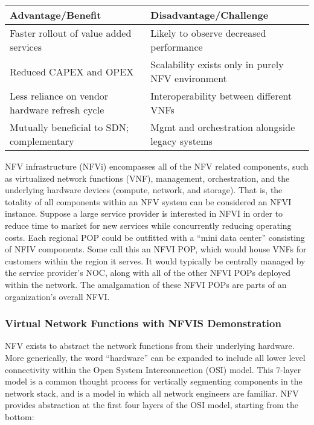 \begin{longtable}{ll}
\toprule
\textbf{Advantage/Benefit}
&
\textbf{Disadvantage/Challenge}
\\ \midrule
Faster rollout of value added services
&
Likely to observe decreased performance
\\ \midrule
Reduced CAPEX and OPEX
&
Scalability exists only in purely NFV environment
\\ \midrule
Less reliance on vendor hardware refresh cycle
&
Interoperability between different VNFs
\\ \midrule
Mutually beneficial to SDN; complementary
&
Mgmt and orchestration alongside legacy systems
\\
\bottomrule
\end{longtable}

NFV infrastructure (NFVi) encompasses all of the NFV related components, such
as virtualized network functions (VNF), management, orchestration, and the
underlying hardware devices (compute, network, and storage). That is, the
totality of all components within an NFV system can be considered an NFVI
instance. Suppose a large service provider is interested in NFVI in order to
reduce time to market for new services while concurrently reducing operating
costs. Each regional POP could be outfitted with a ``mini data center''
consisting of NFIV components. Some call this an NFVI POP, which would house
VNFs for customers within the region it serves. It would typically be
centrally managed by the service provider's NOC, along with all of the other
NFVI POPs deployed within the network. The amalgamation of these NFVI POPs are
parts of an organization's overall NFVI.

\subsubsection{Virtual Network Functions with NFVIS Demonstration}
NFV exists to abstract the network functions from their underlying hardware.
More generically, the word ``hardware'' can be expanded to include all lower
level connectivity within the Open System Interconnection (OSI) model. This
7-layer model is a common thought process for vertically segmenting components
in the network stack, and is a model in which all network engineers are
familiar. NFV provides abstraction at the first four layers of the OSI model,
starting from the bottom:

